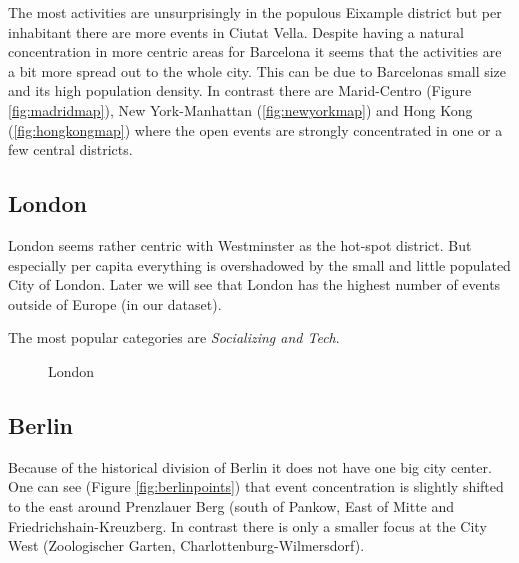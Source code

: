 The most activities are unsurprisingly in the populous Eixample district but per inhabitant there are more events in Ciutat Vella. Despite having a natural concentration in more centric areas for Barcelona it seems that the activities are a bit more spread out to the whole city. This can be due to Barcelonas small size and its high population density. 
In contrast there are Marid-Centro (Figure \ref{fig:madridmap}), New York-Manhattan (\ref{fig:newyorkmap}) and Hong Kong (\ref{fig:hongkongmap}) where the open events are strongly concentrated in one or a few central districts. 

\subsection*{London}

London seems rather centric with Westminster as the hot-spot district. But especially per capita everything is overshadowed by the small and little populated City of London. Later we will see that London has the highest number of events outside of Europe (in our dataset). 

The most popular categories are \emph{Socializing and Tech}. 

\begin{figure}[!h]
	\hfill
	\caption{London}
\end{figure}


\subsection*{Berlin}

Because of the historical division of Berlin it does not have one big city center. One can see (Figure \ref{fig:berlinpoints}) that event concentration is slightly shifted to the east around Prenzlauer Berg (south of Pankow, East of Mitte and Friedrichshain-Kreuzberg. In contrast there is only a smaller focus at the City West (Zoologischer Garten, Charlottenburg-Wilmersdorf). 

